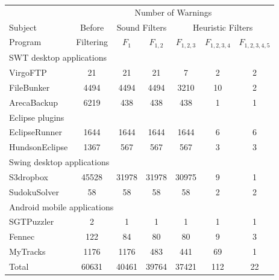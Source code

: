 \begin{table}[t]
\begin{center}
 \fontsize{9pt}{\baselineskip}\selectfont
\setlength{\tabcolsep}{.34\tabcolsep}
\hspace*{-0.2cm}
\begin{tabular}{|l||c|c|c|c|c|c|}
\hline
 & \multicolumn{6}{|c|}{Number of Warnings}  \\
\cline{2-7}
 Subject & Before & \multicolumn{2}{|c|}{Sound Filters}  &  \multicolumn{3}{|c|}{Heuristic Filters}  \\
\cline{3-7}
 Program &Filtering  & $F_1$ & $F_{1,2}$ & $F_{1,2,3}$&$F_{1,2,3,4}$ & $F_{1,2,3,4,5}$\\
\hline \hline
\multicolumn{7}{|l|}{SWT desktop applications}   \\
 \hline
 VirgoFTP &  21 &  21 &  21 & 7 &  2 & 2\\
 \hline
 FileBunker &  4494 &  4494 &  4494 &  3210 &  10  & 2\\
 \hline
 ArecaBackup &  6219 &  438 & 438 &  438  &  1 & 1\\
 \hline
 \hline
\multicolumn{7}{|l|}{Eclipse plugins}   \\
 \hline
 EclipseRunner&  1644 &  1644 &  1644 & 1644 &  6 & 6\\
 \hline
 HundsonEclipse&  1367 &  567 &  567 & 567 &  3 & 3\\
 \hline
 \hline
\multicolumn{7}{|l|}{Swing desktop applications}   \\
 \hline
 S3dropbox&  45528 &  31978 &  31978 & 30975 &  9 & 1\\
 \hline
 SudokuSolver &  58 &  58 &  58 & 58  &  2 & 2\\
 \hline
 \hline
\multicolumn{7}{|l|}{Android mobile applications}   \\
 \hline
 SGTPuzzler&  2 &  1 &  1 & 1 &  1 & 1\\
 \hline
 Fennec &  122 &  84 & 80 & 80 &  9 & 3\\
 \hline
 MyTracks &  1176 &  1176 &  483 & 441 &  69 & 1 \\
\hline
 \hline
 Total &  60631 &  40461 &  39764 &  37421 &  112 & 22 \\
 \hline
\end{tabular}
\end{center}
\vspace{-15pt}
 \vspace{-2mm}
\end{table}


